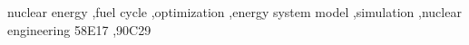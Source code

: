 \begin{keyword}
nuclear energy \sep fuel cycle \sep optimization \sep energy system model \sep simulation \sep nuclear engineering 
\MSC 58E17 \sep 90C29


\end{keyword}

